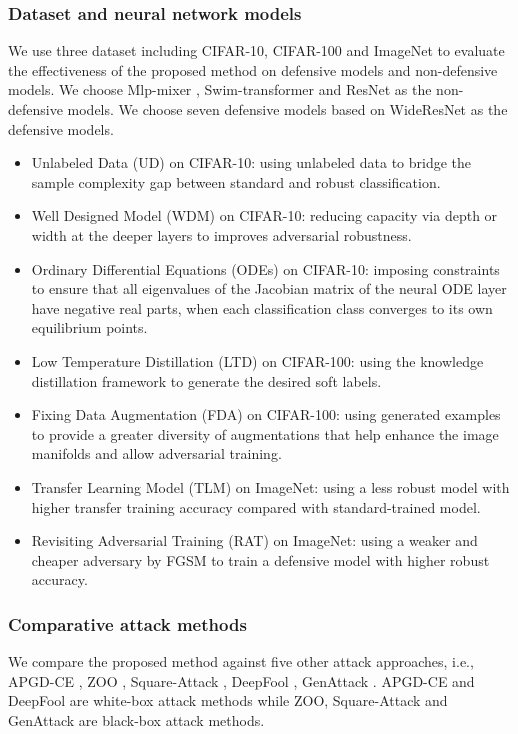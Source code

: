 \documentclass[lettersize,journal]{IEEEtran}
\begin{document}
	\subsubsection{Dataset and neural network models}
	We use three dataset including CIFAR-10, CIFAR-100 and ImageNet to evaluate the effectiveness of the proposed method on defensive models and non-defensive models. We choose Mlp-mixer \cite{tolstikhin2021mlpmixer}, Swim-transformer \cite{liu2021Swin} and ResNet \cite{he2016deep} as the non-defensive models. 
	We choose seven defensive models based on WideResNet as the defensive models.%
	\begin{itemize}
		\item Unlabeled Data (UD) \cite{carmon2022unlabeled} on CIFAR-10: using unlabeled data to bridge the sample complexity gap between standard and robust classification. 
		\item Well Designed Model (WDM) \cite{huang2022exploring} on CIFAR-10: reducing capacity via depth or width at the deeper layers to improves adversarial robustness. 
		\item Ordinary Differential Equations (ODEs) \cite{kang2021stable} on CIFAR-10: imposing constraints to ensure that all eigenvalues of the Jacobian matrix of the neural ODE layer have negative real parts, when each classification class converges to its own equilibrium points.
		\item Low Temperature Distillation (LTD) \cite{chen2021ltd} on CIFAR-100: using the knowledge distillation framework to generate the desired soft labels. 
		\item Fixing Data Augmentation (FDA) \cite{rebuffi2021fixing} on CIFAR-100: using generated examples to provide a greater diversity of augmentations that help enhance the image manifolds and allow adversarial training. 
		\item Transfer Learning Model (TLM) \cite{salman2020adversarially} on ImageNet: using a less robust model with higher transfer training accuracy compared with standard-trained model.
		\item Revisiting Adversarial Training (RAT) \cite{wong2020fast} on ImageNet: using a weaker and cheaper adversary by FGSM to train a defensive model with higher robust accuracy. 
	\end{itemize}
	
	
	\subsubsection{Comparative attack methods}
	We compare the proposed method against five other attack approaches, i.e., APGD-CE \cite{croce2021mind}, ZOO \cite{croce2020minimally}, Square-Attack \cite{andriushchenko2020square}, DeepFool \cite{moosavi2016deepfool}, GenAttack \cite{alzantot2019genattack}. APGD-CE and DeepFool are white-box attack methods while ZOO, Square-Attack and GenAttack are black-box attack methods.
	
\end{document}
